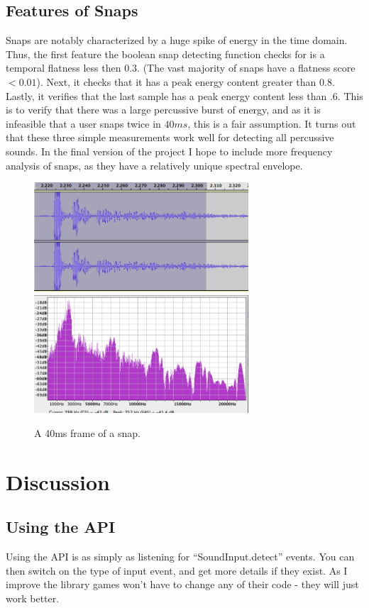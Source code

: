 \documentclass[DIV=calc, paper=a4, fontsize=11pt, twocolumn]{scrartcl}   %
\begin{document}
   \subsection{Features of Snaps}

   Snaps are notably characterized by a huge spike of energy in the time domain. Thus, the first feature the boolean snap detecting function checks for is a temporal flatness less then $0.3$. (The vast majority of snaps have a flatness score $<0.01$). Next, it checks that it has a peak energy content greater than $0.8$. Lastly, it verifies that the last sample has a peak energy content less than $.6$. This is to verify that there was a large percussive burst of energy, and as it is infeasible that a user snaps twice in $40ms$, this is a fair assumption. It turns out that these three simple measurements work well for detecting all percussive sounds. In the final version of the project I hope to include more frequency analysis of snaps, as they have a relatively unique spectral envelope.



    \begin{figure}[h]
   \centering
   \includegraphics[width=80mm]{figures/snapTimeDomainFrame.png}
   \includegraphics[width=80mm]{figures/SnapFreqDomainFrame.png}
   \caption{A 40ms frame of a snap. }
   \label{overflow}

\end{figure}


\section{Discussion}
   \subsection{Using the API}
      Using the API is as simply as listening for ``SoundInput.detect'' events. You can then switch on the type of input event, and get more details if they exist. As I improve the library games won't have to change any of their code - they will just work better.
\end{document}
